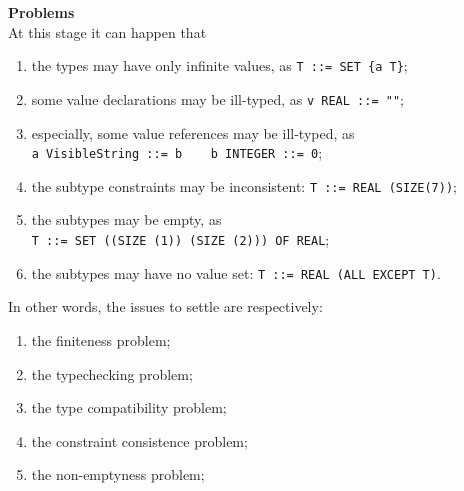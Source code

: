 \documentclass[12pt]{article}
\begin{document}
\begin{slide}
\textbf{Problems}\\

At this stage it can happen that

\begin{enumerate}
  
  \item \label{finiteness} the types may have only infinite
        values, as \texttt{T ::= SET \{a T\}};

  \item \label{type_conformance} some value declarations may be
        ill-typed, as \texttt{v REAL ::= ""};

  \item \label{type_compatibility} especially, some value references
        may be ill-typed, as\\
        \verb+a VisibleString ::= b    b INTEGER ::= 0+;

  \item \label{constraint_consistence} the subtype constraints may
        be inconsistent: \texttt{T ::= REAL (SIZE(7))};

  \item \label{subtype_non_emptyness} the subtypes may be empty, as\\
        \texttt{T ::= SET ((SIZE (1))  (SIZE (2))) OF REAL};
        
  \item \label{solvability} the subtypes may have no value set:
        \texttt{T ::= REAL (ALL EXCEPT T)}. 

\end{enumerate}

\pagebreak

\vspace*{1cm}

In other words, the issues to settle are respectively:

\begin{enumerate}

  \item the finiteness problem;
 
  \item the typechecking problem;

  \item the type compatibility problem;

  \item the constraint consistence problem;

  \item the non-emptyness problem;


\end{enumerate}
\end{slide}
\end{document}
